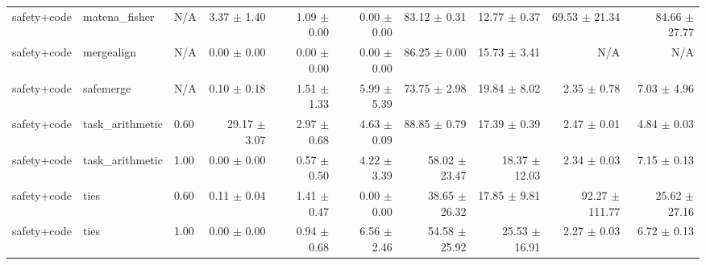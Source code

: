 \documentclass{article}
\begin{document}
\begin{table}[H]
{\begin{tabular}{lllrrrrrrr}
safety+code & matena\_fisher & N/A & 3.37 $\pm$ 1.40 & 1.09 $\pm$ 0.00 & 0.00 $\pm$ 0.00 & 83.12 $\pm$ 0.31 & 12.77 $\pm$ 0.37 & 69.53 $\pm$ 21.34 & 84.66 $\pm$ 27.77 \\
safety+code & mergealign & N/A & 0.00 $\pm$ 0.00 & 0.00 $\pm$ 0.00 & 0.00 $\pm$ 0.00 & 86.25 $\pm$ 0.00 & 15.73 $\pm$ 3.41 & N/A & N/A \\
safety+code & safemerge & N/A & 0.10 $\pm$ 0.18 & 1.51 $\pm$ 1.33 & 5.99 $\pm$ 5.39 & 73.75 $\pm$ 2.98 & 19.84 $\pm$ 8.02 & 2.35 $\pm$ 0.78 & 7.03 $\pm$ 4.96 \\
safety+code & task\_arithmetic & 0.60 & 29.17 $\pm$ 3.07 & 2.97 $\pm$ 0.68 & 4.63 $\pm$ 0.09 & 88.85 $\pm$ 0.79 & 17.39 $\pm$ 0.39 & 2.47 $\pm$ 0.01 & 4.84 $\pm$ 0.03 \\
safety+code & task\_arithmetic & 1.00 & 0.00 $\pm$ 0.00 & 0.57 $\pm$ 0.50 & 4.22 $\pm$ 3.39 & 58.02 $\pm$ 23.47 & 18.37 $\pm$ 12.03 & 2.34 $\pm$ 0.03 & 7.15 $\pm$ 0.13 \\
safety+code & ties & 0.60 & 0.11 $\pm$ 0.04 & 1.41 $\pm$ 0.47 & 0.00 $\pm$ 0.00 & 38.65 $\pm$ 26.32 & 17.85 $\pm$ 9.81 & 92.27 $\pm$ 111.77 & 25.62 $\pm$ 27.16 \\
safety+code & ties & 1.00 & 0.00 $\pm$ 0.00 & 0.94 $\pm$ 0.68 & 6.56 $\pm$ 2.46 & 54.58 $\pm$ 25.92 & 25.53 $\pm$ 16.91 & 2.27 $\pm$ 0.03 & 6.72 $\pm$ 0.13 \\
\bottomrule
\end{tabular}
}
\end{table}


\begin{table}[H]
\centering
\caption{メイン実験 シード別詳細 - Method: task\_arithmetic, Pattern: safety+code}
\label{tab:main_seeds_taskarithmetic_safety_code}
\small
{}
\end{table}
\end{document}
